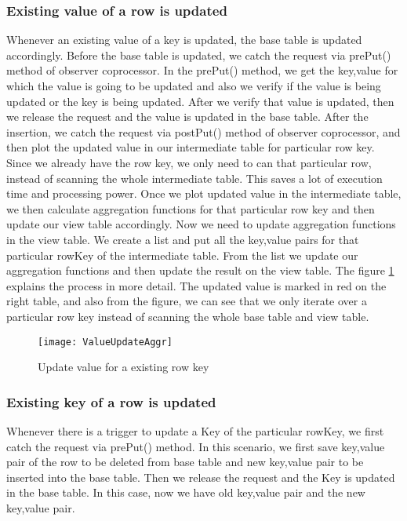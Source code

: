\documentclass[11pt,a4paper,bibtotoc,idxtotoc,headsepline,footsepline,footexclude,BCOR12mm,DIV13]{scrbook}
\begin{document}
\newpage
\subsubsection{Existing value of a row is updated}
Whenever an existing value of a key is updated, the base table is updated accordingly. Before the base table is updated, we catch the request via prePut() method of observer coprocessor. In the prePut() method, we get the key,value for which the value is going to be updated and also we verify if the value is being updated or the key is being updated. After we verify that value is updated, then we release the request and the value is updated in the base table. After the insertion, we catch the request via postPut() method of observer coprocessor, and then plot the updated value in our intermediate table for particular row key. Since we already have the row key, we only need to can that particular row, instead of scanning the whole intermediate table. This saves a lot of execution time and processing power. Once we plot updated value in the intermediate table, we then calculate aggregation functions for that particular row key and then update our view table accordingly. Now we need to update aggregation functions in the view table. We create a list and put all the key,value pairs for that particular rowKey of the intermediate table. From the list we update our aggregation functions and then update the result on the view table. The figure \ref{sec:updatevalueforexistingkey} explains the process in more detail. The updated value is marked in red on the right table, and also from the figure, we can see that we only iterate over a particular row key instead of scanning the whole base table and view table.

\begin{figure}
    \centering
    \texttt{[image: ValueUpdateAggr]}
    \caption{Update value for a existing row key}
    \label{sec:updatevalueforexistingkey}
    
\end{figure}  


\subsubsection{Existing key of a row is updated}
\label{subsubsec:keyupdate}

Whenever there is a trigger to update a Key of the particular rowKey, we first catch the request via prePut() method. In this scenario, we first save key,value pair of the row to be deleted from base table and new key,value pair to be inserted into the base table. Then we release the request and the Key is updated in the base table. In this case, now we have old key,value pair and the new key,value pair. 
\end{document}
